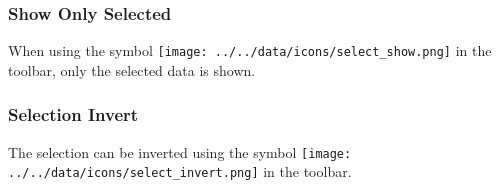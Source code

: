 %
%
%
%
%

\subsubsection{Show Only Selected}

When using the symbol \texttt{[image: ../../data/icons/select\_show.png]} in the toolbar, only the selected data is shown.

\subsubsection{Selection Invert}

The selection can be inverted using the symbol \texttt{[image: ../../data/icons/select\_invert.png]} in the toolbar.

%
%
%

